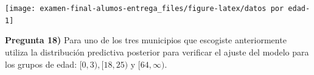 \documentclass[
]{article}
\newenvironment{Shaded}{\begin{snugshade}}{\end{snugshade}}
\newcommand{\DataTypeTok}[1]{\textcolor[rgb]{0.13,0.29,0.53}{#1}}
\newcommand{\FloatTok}[1]{\textcolor[rgb]{0.00,0.00,0.81}{#1}}
\newcommand{\KeywordTok}[1]{\textcolor[rgb]{0.13,0.29,0.53}{\textbf{#1}}}
\newcommand{\NormalTok}[1]{#1}
\newcommand{\OperatorTok}[1]{\textcolor[rgb]{0.81,0.36,0.00}{\textbf{#1}}}
\newcommand{\StringTok}[1]{\textcolor[rgb]{0.31,0.60,0.02}{#1}}
\begin{document}
\begin{Shaded}
\end{Shaded}

\begin{center}\texttt{[image: examen-final-alumos-entrega\_files/figure-latex/datos por edad-1]} \end{center}

\textbf{Pregunta 18)} Para uno de los tres municipios que escogiste
anteriormente utiliza la distribución predictiva posterior para
verificar el ajuste del modelo para los grupos de edad:
\([0,3), [18,25) \text{ y } [64, \infty).\)
\end{document}
